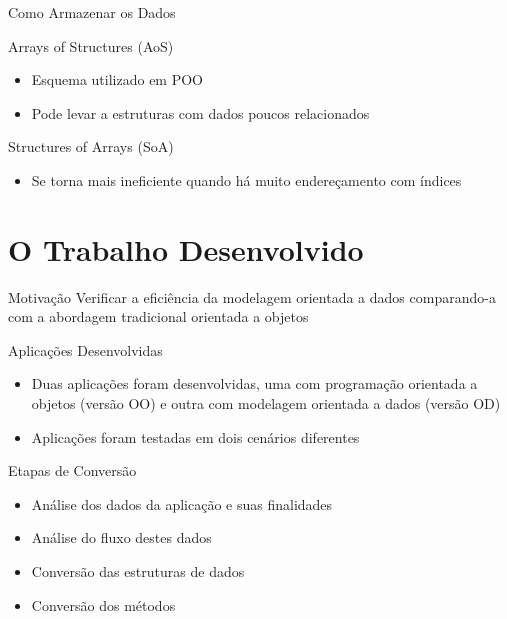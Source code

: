 \documentclass{beamer}
\begin{document}
\begin{frame}{Como Armazenar os Dados}
    \begin{minipage}[b]{0.4\textwidth}
        Arrays of Structures (AoS)
        \begin{itemize}
            \item Esquema utilizado em POO
            \item Pode levar a estruturas com dados poucos relacionados
        \end{itemize}
    \end{minipage}
    \hspace{1.5cm}
    \begin{minipage}[b]{0.4\textwidth}
        Structures of Arrays (SoA)
        \begin{itemize}
            \item Se torna mais ineficiente quando há muito endereçamento com índices
        \end{itemize}
    \end{minipage}
\end{frame}

\section{O Trabalho Desenvolvido}

\frame{\tableofcontents[currentsection]}

\begin{frame}{Motivação}
    \centering
    \LARGE{Verificar a eficiência da modelagem orientada a dados comparando-a 
    com a abordagem tradicional orientada a objetos}
\end{frame}

\begin{frame}{Aplicações Desenvolvidas}
    \begin{itemize}
        \item Duas aplicações foram desenvolvidas, uma com programação orientada a objetos (versão OO)
            e outra com modelagem orientada a dados (versão OD)
        \item Aplicações foram testadas em dois cenários diferentes
    \end{itemize}
\end{frame}

\begin{frame}{Etapas de Conversão}
    \begin{itemize}
        \item Análise dos dados da aplicação e suas finalidades
        \item Análise do fluxo destes dados
        \item Conversão das estruturas de dados
        \item Conversão dos métodos
    \end{itemize}
\end{frame}
\end{document}

